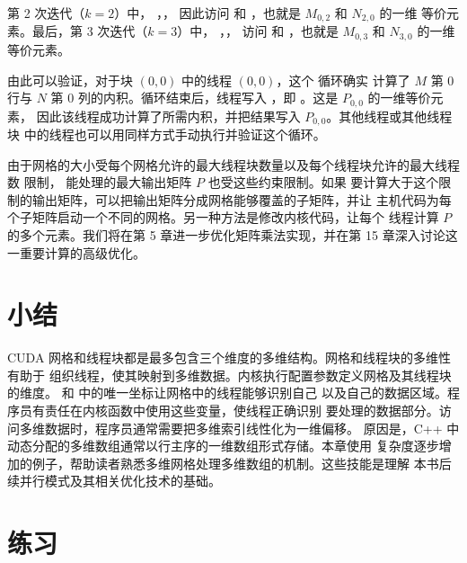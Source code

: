 第 2 次迭代（$k=2$）中，
，，
因此访问  和 ，也就是 $M_{0,2}$ 和 $N_{2,0}$ 的一维
等价元素。最后，第 3 次迭代（$k=3$）中，
，，
访问  和 ，也就是 $M_{0,3}$ 和 $N_{3,0}$ 的一维
等价元素。

由此可以验证，对于块 $(0,0)$ 中的线程 $(0,0)$，这个  循环确实
计算了 $M$ 第 0 行与 $N$ 第 0 列的内积。循环结束后，线程写入
，即 。这是 $P_{0,0}$ 的一维等价元素，
因此该线程成功计算了所需内积，并把结果写入 $P_{0,0}$。其他线程或其他线程块
中的线程也可以用同样方式手动执行并验证这个循环。

由于网格的大小受每个网格允许的最大线程块数量以及每个线程块允许的最大线程数
限制， 能处理的最大输出矩阵 $P$ 也受这些约束限制。如果
要计算大于这个限制的输出矩阵，可以把输出矩阵分成网格能够覆盖的子矩阵，并让
主机代码为每个子矩阵启动一个不同的网格。另一种方法是修改内核代码，让每个
线程计算 $P$ 的多个元素。我们将在第 5 章进一步优化矩阵乘法实现，并在第 15
章深入讨论这一重要计算的高级优化。

\section{小结}
\label{sec:chapter-3-summary}

CUDA 网格和线程块都是最多包含三个维度的多维结构。网格和线程块的多维性有助于
组织线程，使其映射到多维数据。内核执行配置参数定义网格及其线程块的维度。
 和  中的唯一坐标让网格中的线程能够识别自己
以及自己的数据区域。程序员有责任在内核函数中使用这些变量，使线程正确识别
要处理的数据部分。访问多维数据时，程序员通常需要把多维索引线性化为一维偏移。
原因是，C++ 中动态分配的多维数组通常以行主序的一维数组形式存储。本章使用
复杂度逐步增加的例子，帮助读者熟悉多维网格处理多维数组的机制。这些技能是理解
本书后续并行模式及其相关优化技术的基础。

\section*{练习}

